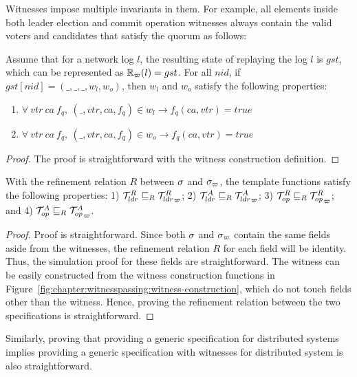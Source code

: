 Witnesses impose multiple invariants in them.
For example, all elements inside both leader election and commit operation witnesses 
always contain the valid voters and candidates that satisfy the quorum as follows:

\begin{theorem}\label{thm:witness-invariant}
Assume that for a network log $l$, the resulting state of replaying the log $l$ 
	is $gst$, which can be represented as $\mathbb{R}_\varpi(l) = gst$. 
For all $nid$, if $gst[nid] = (\_, \_, \_, w_l, w_o)$, then $w_l$ and $w_o$ satisfy the following properties:
\begin{enumerate}
\item $\forall\ vtr\ ca\ f_q, \ (\_, vtr, ca, f_q) \in w_l \rightarrow f_q(ca, vtr) = true$
\item $\forall\ vtr\ ca\ f_q, \ (\_, vtr, ca, f_q) \in w_o \rightarrow f_q(ca, vtr) = true$
\end{enumerate}
\end{theorem}

\begin{proof}
The proof is straightforward with the witness construction definition.
\end{proof}

\begin{theorem}\label{theorem:chapter:witnesspassing:spec-refine}
With the refinement relation $R$ between $\sigma$ and $\sigma_\varpi$, 
the template functions satisfy the following properties:
1) $\mathcal{T}^{R}_{ldr}  \sqsubseteq_{R} {\mathcal{T}^{R}_{ldr}}_{\varpi} $; 
2) $\mathcal{T}^{A}_{ldr}  \sqsubseteq_{R} {\mathcal{T}^{A}_{ldr}}_{\varpi} $; 
3) $\mathcal{T}^{R}_{op}  \sqsubseteq_{R} {\mathcal{T}^{R}_{op}}_{\varpi} $; and
4) $\mathcal{T}^{A}_{op}  \sqsubseteq_{R} {\mathcal{T}^{A}_{op}}_{\varpi}$.
\end{theorem}

\begin{proof}
Proof is straightforward. 
Since both $\sigma$ and $\sigma_\varpi$ contain the same fields aside from
the witnesses, the refinement relation $R$ for each field will be identity.
Thus, the simulation proof for these fields are straightforward. 
The witness can be easily constructed from the witness construction functions
in Figure~\ref{fig:chapter:witnesspassing:witness-construction}, which do not touch fields other
than the witness. 
Hence, proving the refinement relation between the two specifications is
straightforward.
\end{proof}

Similarly, proving that providing a generic specification for distributed
systems implies providing a generic specification with witnesses for distributed
system is also straightforward.


